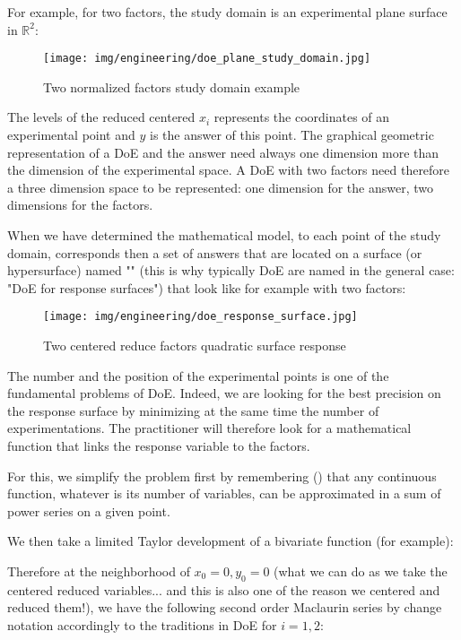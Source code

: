 	For example, for two factors, the study domain is an experimental plane surface in $\mathbb{R}^2$:
	\begin{figure}[H]
		\begin{center}
		\texttt{[image: img/engineering/doe\_plane\_study\_domain.jpg]}
		\end{center}	
		\caption{Two normalized factors study domain example}
	\end{figure}
	The levels of the reduced centered $x_i$  represents the coordinates of an experimental point and $y$ is the answer of this point. The graphical geometric representation of a DoE and the answer need always one dimension more than the dimension of the experimental space. A DoE with two factors need therefore a three dimension space to be represented: one dimension for the answer, two dimensions for the factors.

	When we have determined the mathematical model, to each point of the study domain, corresponds then a set of answers that are located on a surface (or hypersurface) named "" (this is why typically DoE are named in the general case: "DoE for response surfaces") that look like for example with two factors:
	\begin{figure}[H]
		\begin{center}
		\texttt{[image: img/engineering/doe\_response\_surface.jpg]}
		\end{center}	
		\caption{Two centered reduce factors quadratic surface response}
	\end{figure}
	The number and the position of the experimental points is one of the fundamental problems of DoE. Indeed, we are looking for the best precision on the response surface by minimizing at the same time the number of experimentations. The practitioner will therefore look for a mathematical function that links the response variable to the factors.
	
	For this, we simplify the problem first by remembering () that any continuous function, whatever is its number of variables, can be approximated in a sum of power series on a given point.

	We then take a limited Taylor development of a bivariate function (for example\label{bivariat taylor expansion doe}):
	
	Therefore at the neighborhood of $x_0=0,y_0=0$ (what we can do as we take the centered reduced variables... and this is also one of the reason we centered and reduced them!), we have the following second order Maclaurin series by change notation accordingly to the traditions in DoE for $i=1,2$:
	
